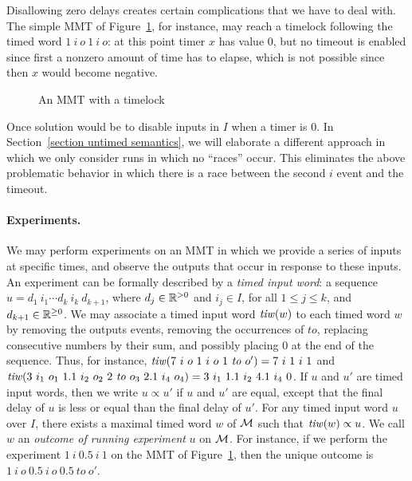 Disallowing zero delays creates certain complications that we have to deal with. The simple MMT of Figure~\ref{fig:timelock}, for instance,
may reach a timelock following the timed word $1 ~ i ~ o ~ 1 ~ i ~ o$: at this point timer $x$ has value $0$, but no timeout is enabled since first a nonzero amount of time has to elapse, which is not possible since then $x$ would become negative.
\begin{figure}[ht]
\begin{center}
\caption{An MMT with a timelock}
\label{fig:timelock}
\end{center}
\end{figure}
Once solution would be to disable inputs in $I$ when a timer is $0$. 
In Section~\ref{section untimed semantics}, we will elaborate
a different approach in which we only consider runs in which no ``races'' occur. This eliminates the above problematic
behavior in which there is a race between the second $i$ event and the timeout.
\fi

\paragraph{Experiments.}
We may perform experiments on an MMT in which we
provide a series of inputs at specific times, and observe the outputs that occur in response to these inputs.
An experiment can be formally described by a \emph{timed input word}: a sequence
$u = d_1 ~ i_1 \cdots d_k ~ i_k ~ d_{k+1}$, where $d_j \in {\mathbb R}^{> 0}$ and $i_j \in I$, for all $1 \leq j \leq k$,
and $d_{k+1} \in {\mathbb R}^{\geq 0}$.
%
We may associate a timed input word $\mathit{tiw}(w)$ to each timed word $w$ by 
removing the outputs events, 
removing the occurrences of $\mathit{to}$, 
replacing consecutive numbers by their sum, 
and possibly placing $0$ at the end of the sequence.
Thus, for instance,
$\mathit{tiw} (7 ~ i ~ o ~ 1 ~ i ~ o ~ 1 ~ \mathit{to} ~ o') = 7 ~ i ~ 1 ~ i ~ 1$ and
$\mathit{tiw} (3 ~ i_1 ~ o_1 ~ 1.1 ~ i_2 ~ o_2 ~ 2 ~ \mathit{to} ~ o_3 ~ 2.1 ~ i_4 ~ o_4) = 3 ~ i_1 ~ 1.1 ~ i_2 ~ 4.1 ~ i_4 ~ 0$.
%
If $u$ and $u'$ are timed input words, then we write $u \propto u'$ if $u$ and $u'$ are equal, except that the final delay of $u$ is less or equal than the final delay of $u'$.
For any timed input word $u$ over $I$,  there exists a maximal timed word $w$ of ${\mathcal M}$ such that $\mathit{tiw}(w) \propto u$.
We call $w$ an \emph{outcome of running experiment} $u$ on ${\mathcal M}$.
For instance, if we perform the experiment $1 ~ i ~ 0.5 ~ i ~ 1$ on the MMT of Figure~\ref{fig:timelock},
then the unique outcome is $1 ~ i ~ o ~ 0.5 ~ i ~ o ~ 0.5 ~ \mathit{to} ~ o'$.

